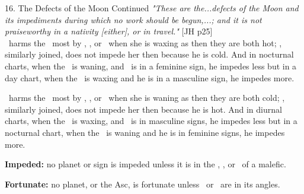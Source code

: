 \begin{frame}[t]{16. The Defects of the Moon Continued}
\textsl{"These are the...defects of the Moon and its impediments during which no work should be begun,...; and it is not praiseworthy in a nativity [either], or in travel."} [JH p25] \\ \vspace{0.25cm}
\Mars\ harms the \Moon\ most by \Conjunction, \Square, or \Opposition\ when she is waxing as then they are both hot; \Saturn, similarly joined, does not impede her then because he is cold. And in nocturnal charts, when the \Moon\ is waning, and \Mars\ is in a feminine sign, he impedes less but in a day chart, when the \Moon\ is waxing and he is in a masculine sign, he impedes more.

\Saturn\ harms the \Moon\ most by \Conjunction, \Square, or \Opposition\ when she is waning as then they are both cold; \Mars, similarly joined, does not impede her then because he is hot. And in diurnal charts, when the \Moon\ is waxing, and \Saturn\ is in masculine signs, he impedes less but in a nocturnal chart, when the \Moon\ is waning and he is in feminine signs, he impedes more.

\textbf{Impeded:} no planet or sign is impeded unless it is in the \Conjunction, \Square, or \Opposition\ of a malefic.

\textbf{Fortunate:} no planet, or the Asc, is fortunate unless \Venus\ or \Jupiter\ are in its angles.

\end{frame}
